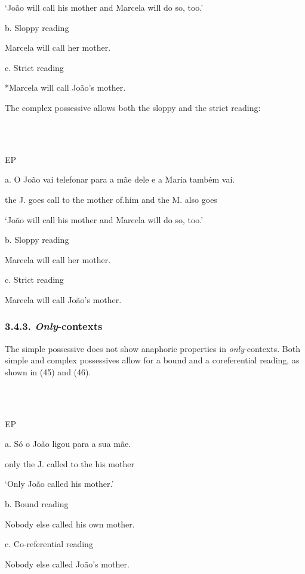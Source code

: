 \documentclass[output=paper]{langsci/langscibook}
\begin{document}
‘João will call his mother and Marcela will do so, too.’

b.  Sloppy reading

Marcela will call her mother.

c.  Strict reading

*Marcela will call João’s mother.

The complex possessive allows both the sloppy and the strict reading:

\ea%
    \label{ex:key:44}
    \gll\\
        \\
    \glt
    \z

          EP

  a.  O João vai telefonar para a mãe   dele e   a Maria também vai.

the J. goes call to the mother of.him and the M. also goes

‘João will call his mother and Marcela will do so, too.’

b.  Sloppy reading

Marcela will call her mother.

c.  Strict reading

Marcela will call João’s mother.

\subsubsection{ 3.4.3. \textit{Only}{}-contexts}

The simple possessive does not show anaphoric properties in \textit{only}{}-contexts. Both simple and complex possessives allow for a bound and a coreferential reading, as shown in (45) and (46).

\ea%
    \label{ex:key:45}
    \gll\\
        \\
    \glt
    \z

          EP

  a.  Só o João ligou para a sua mãe.

only the J. called to the his mother

‘Only João called his mother.’

b.  Bound reading

Nobody else called his own mother.

c.  Co-referential reading

Nobody else called João’s mother.

\ea%
    \label{ex:key:46}
    \gll\\
        \\
    \glt
    \z
\end{document}
